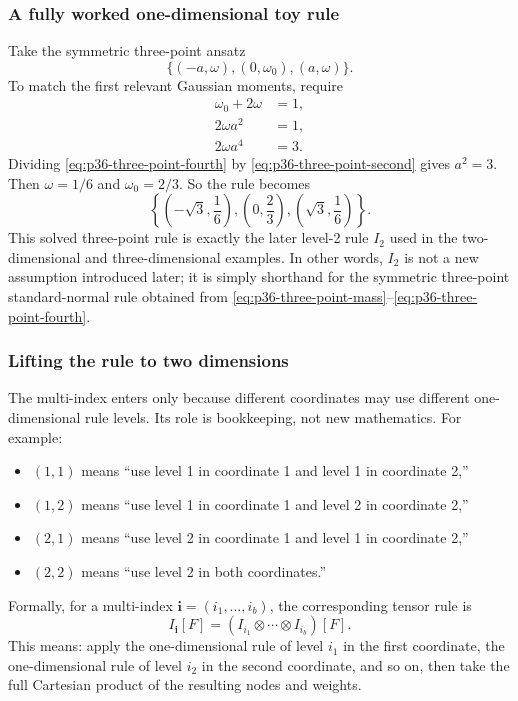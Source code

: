 \documentclass[11pt]{article}
\numberwithin{equation}{section}
\begin{document}
\subsubsection{A fully worked one-dimensional toy rule}

Take the symmetric three-point ansatz
\begin{equation}
  \{(-a,\omega),(0,\omega_0),(a,\omega)\}.
  \label{eq:p36-three-point-ansatz}
\end{equation}
To match the first relevant Gaussian moments, require
\begin{align}
  \omega_0+2\omega &= 1,
  \label{eq:p36-three-point-mass}\\
  2\omega a^2 &= 1,
  \label{eq:p36-three-point-second}\\
  2\omega a^4 &= 3.
  \label{eq:p36-three-point-fourth}
\end{align}
Dividing \eqref{eq:p36-three-point-fourth} by
\eqref{eq:p36-three-point-second} gives \(a^2=3\).  Then
\(\omega=1/6\) and \(\omega_0=2/3\).  So the rule becomes
\begin{equation}
  \left\{\left(-\sqrt3,\frac16\right),\left(0,\frac23\right),
  \left(\sqrt3,\frac16\right)\right\}.
  \label{eq:p36-three-point-rule}
\end{equation}
This solved three-point rule is exactly the later level-2 rule \(I_2\) used in
the two-dimensional and three-dimensional examples.  In other words, \(I_2\) is
not a new assumption introduced later; it is simply shorthand for the symmetric
three-point standard-normal rule obtained from
\eqref{eq:p36-three-point-mass}--\eqref{eq:p36-three-point-fourth}.

\subsubsection{Lifting the rule to two dimensions}

The multi-index enters only because different coordinates may use different
one-dimensional rule levels.  Its role is bookkeeping, not new mathematics.  For
example:
\begin{itemize}[leftmargin=0.28in]
  \item \((1,1)\) means ``use level 1 in coordinate 1 and level 1 in coordinate
  2,''
  \item \((1,2)\) means ``use level 1 in coordinate 1 and level 2 in coordinate
  2,''
  \item \((2,1)\) means ``use level 2 in coordinate 1 and level 1 in coordinate
  2,''
  \item \((2,2)\) means ``use level 2 in both coordinates.''
\end{itemize}
Formally, for a multi-index \(\mathbf i=(i_1,\ldots,i_b)\), the corresponding
tensor rule is
\begin{equation}
  I_{\mathbf i}[F]
  =
  (I_{i_1}\otimes\cdots\otimes I_{i_b})[F].
  \label{eq:p31-tensor-rule}
\end{equation}
This means: apply the one-dimensional rule of level \(i_1\) in the first
coordinate, the one-dimensional rule of level \(i_2\) in the second coordinate,
and so on, then take the full Cartesian product of the resulting nodes and
weights.
\end{document}
